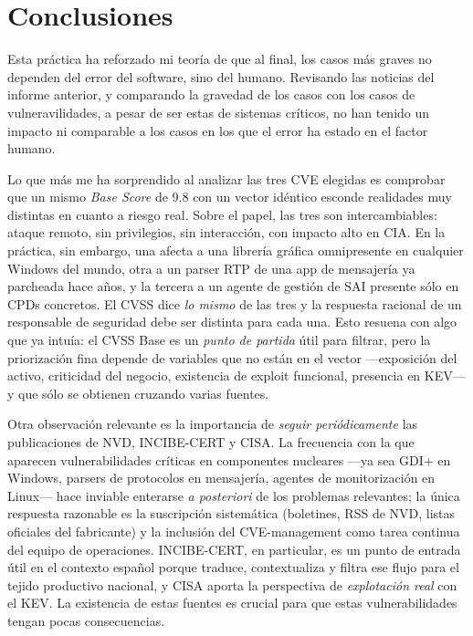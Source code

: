 \chapter{Conclusiones}

Esta práctica ha reforzado mi teoría de que al final, los casos más graves no dependen del error del software, sino del humano. Revisando las noticias del informe anterior, y comparando la gravedad de los casos con los casos de vulneravilidades, a pesar de ser estas de sistemas críticos, no han tenido un impacto ni comparable a los casos en los que el error ha estado en el factor humano. 

Lo que más me ha sorprendido al analizar las tres CVE elegidas es comprobar que un mismo \textit{Base Score} de 9.8 con un vector idéntico esconde realidades muy distintas en cuanto a riesgo real. Sobre el papel, las tres son intercambiables: ataque remoto, sin privilegios, sin interacción, con impacto alto en CIA. En la práctica, sin embargo, una afecta a una librería gráfica omnipresente en cualquier Windows del mundo, otra a un parser RTP de una app de mensajería ya parcheada hace años, y la tercera a un agente de gestión de SAI presente sólo en CPDs concretos. El CVSS dice \textit{lo mismo} de las tres y la respuesta racional de un responsable de seguridad debe ser distinta para cada una. Esto resuena con algo que ya intuía: el CVSS Base es un \textit{punto de partida} útil para filtrar, pero la priorización fina depende de variables que no están en el vector ---exposición del activo, criticidad del negocio, existencia de exploit funcional, presencia en KEV--- y que sólo se obtienen cruzando varias fuentes.

Otra observación relevante es la importancia de \textit{seguir periódicamente} las publicaciones de NVD, INCIBE-CERT y CISA. La frecuencia con la que aparecen vulnerabilidades críticas en componentes nucleares ---ya sea GDI+ en Windows, parsers de protocolos en mensajería, agentes de monitorización en Linux--- hace inviable enterarse \textit{a posteriori} de los problemas relevantes; la única respuesta razonable es la suscripción sistemática (boletines, RSS de NVD, listas oficiales del fabricante) y la inclusión del CVE-management como tarea continua del equipo de operaciones. INCIBE-CERT, en particular, es un punto de entrada útil en el contexto español porque traduce, contextualiza y filtra ese flujo para el tejido productivo nacional, y CISA aporta la perspectiva de \textit{explotación real} con el KEV. La existencia de estas fuentes es crucial para que estas vulnerabilidades tengan pocas consecuencias.

